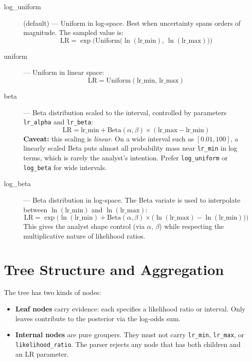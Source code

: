 \documentclass[11pt,a4paper]{article}
\begin{document}
\begin{description}
\item[log\_uniform] (default) --- Uniform in log-space. Best when uncertainty
  spans orders of magnitude. The sampled value is:
  \begin{equation}
  \text{LR} = \exp\!\Big(\text{Uniform}\big(\ln(\text{lr\_min}),\, \ln(\text{lr\_max})\big)\Big)
  \end{equation}

\item[uniform] --- Uniform in linear space:
  \begin{equation}
  \text{LR} = \text{Uniform}(\text{lr\_min},\, \text{lr\_max})
  \end{equation}

\item[beta] --- Beta distribution scaled to the interval, controlled by
  parameters \texttt{lr\_alpha} and \texttt{lr\_beta}:
  \begin{equation}
  \text{LR} = \text{lr\_min} + \text{Beta}(\alpha, \beta) \times (\text{lr\_max} - \text{lr\_min})
  \end{equation}
  \textbf{Caveat:} this scaling is \emph{linear}.  On a wide interval such as
  $[0.01, 100]$, a linearly scaled Beta puts almost all probability mass near
  \texttt{lr\_min} in log terms, which is rarely the analyst's intention.
  Prefer \texttt{log\_uniform} or \texttt{log\_beta} for wide intervals.

\item[log\_beta] --- Beta distribution in log-space.  The Beta variate is used
  to interpolate between $\ln(\text{lr\_min})$ and $\ln(\text{lr\_max})$:
  \begin{equation}
  \text{LR} = \exp\!\Big(\ln(\text{lr\_min}) + \text{Beta}(\alpha,\beta)
    \times \big(\ln(\text{lr\_max}) - \ln(\text{lr\_min})\big)\Big)
  \end{equation}
  This gives the analyst shape control (via $\alpha$, $\beta$) while respecting
  the multiplicative nature of likelihood ratios.
\end{description}

\section{Tree Structure and Aggregation}

The tree has two kinds of nodes:
\begin{itemize}
\item \textbf{Leaf nodes} carry evidence: each specifies a likelihood ratio
  or interval.  Only leaves contribute to the posterior via the log-odds sum.
\item \textbf{Internal nodes} are pure groupers.  They must not carry
  \texttt{lr\_min}, \texttt{lr\_max}, or \texttt{likelihood\_ratio}.  The
  parser rejects any node that has both children and an LR parameter.
\end{itemize}
\end{document}
